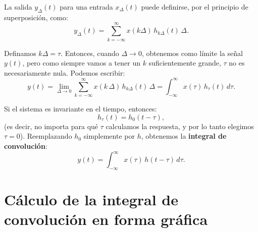 La salida $y_{\Delta}(t)$ para una entrada $x_{\Delta}(t)$ puede definirse, por el principio de superposición, como:
\begin{equation}
	y_{\Delta}(t) = \sum_{k=-\infty}^{\infty} x(k\Delta) \, h_{k\Delta}(t) \, \Delta.
\end{equation}

Definamos $k\Delta = \tau$. Entonces, cuando $\Delta \to 0$, obtenemos como límite la señal $y(t)$, pero como siempre vamos a tener un $k$ suficientemente grande, $\tau$ no es necesariamente nula. Podemos escribir:
\begin{equation}
	y(t) = \lim_{\Delta \to 0} \sum_{k=-\infty}^{\infty} x(k \, \Delta) \, h_{k\Delta}(t) \, \Delta = \int_{-\infty}^{\infty} x(\tau) \, h_{\tau}(t) \, d\tau .
\end{equation}

Si el sistema es invariante en el tiempo, entonces:
\begin{equation}
	h_{\tau}(t) = h_{0}(t-\tau) ,
\end{equation}
(es decir, no importa para qué $\tau$ calculamos la respuesta, y por lo tanto elegimos $\tau=0$). Reemplazando $h_0$ simplemente por $h$, obtenemos la \textbf{integral de convolución}:
\begin{equation}
	y(t) = \int_{-\infty}^{\infty} x(\tau) \, h(t-\tau) \, d\tau .
\end{equation}

\section{Cálculo de la integral de convolución en forma gráfica}


